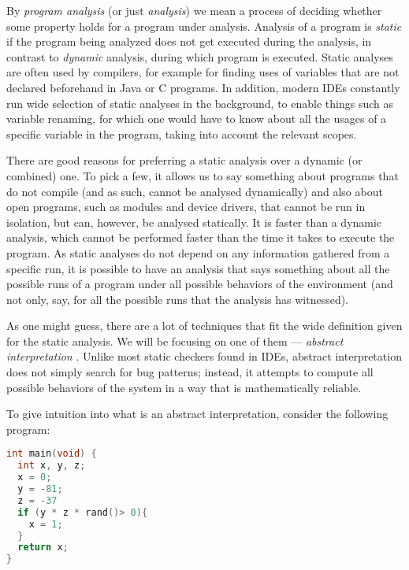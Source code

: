 \documentclass[..thesis.tex]{subfiles}
\begin{document}

By \textit{program analysis} (or just \textit{analysis}) we mean a process of deciding whether some property holds for a program under analysis.
Analysis of a program is \textit{static} if the program being analyzed does not get executed during the analysis, in contrast to \textit{dynamic} analysis,
during which program is executed. Static analyses are often used by compilers, for example for finding uses of variables that are not declared beforehand
in Java or C programs. In addition, modern IDEs constantly run wide selection of static analyses in the background, to enable things such as variable renaming,
for which one would have to know about all the usages of a specific variable in the program, taking into account the relevant scopes. 



There are good reasons for preferring a static analysis over a dynamic (or combined) one.
To pick a few, it allows us to say something about programs that do not compile (and as such, cannot be analysed dynamically) and also about open programs,
such as modules and device drivers, that cannot be run in isolation, but can, however, be analysed statically.  
It is faster than a dynamic analysis, which cannot be performed faster than the time it takes to execute the program.
As static analyses do not depend on any information gathered from a specific run, it is possible to have an analysis that says something
about all the possible runs of a program under all possible behaviors of the environment (and not only, say, for all the possible runs that the analysis has witnessed).



As one might guess, there are a lot of techniques that fit the wide definition given for the static analysis.
We will be focusing on one of them --- \textit{abstract interpretation} \cite{cousot_abstract_1977}. 
Unlike most static checkers found in IDEs, abstract interpretation does not simply search for bug patterns; instead,
it attempts to compute all possible behaviors of the system in a way that is mathematically reliable.



To give intuition into what is an abstract interpretation, consider the following program:

\begin{lstlisting}[language=C,style=def]
int main(void) {
  int x, y, z;
  x = 0;
  y = -81;
  z = -37
  if (y * z * rand()> 0){
    x = 1;
  }
  return x;
}
\end{lstlisting}
\end{document}
